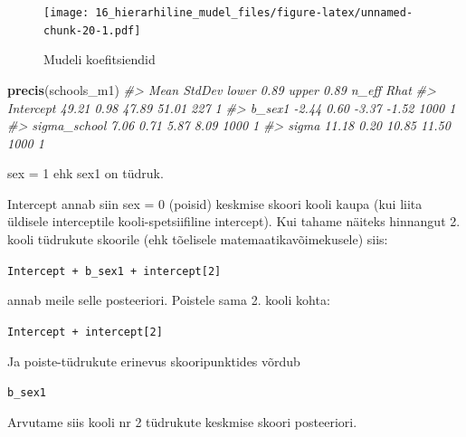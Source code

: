 \documentclass[]{book}
\newenvironment{Shaded}{\begin{snugshade}}{\end{snugshade}}
\newcommand{\CommentTok}[1]{\textcolor[rgb]{0.56,0.35,0.01}{\textit{#1}}}
\newcommand{\DataTypeTok}[1]{\textcolor[rgb]{0.13,0.29,0.53}{#1}}
\newcommand{\DecValTok}[1]{\textcolor[rgb]{0.00,0.00,0.81}{#1}}
\newcommand{\KeywordTok}[1]{\textcolor[rgb]{0.13,0.29,0.53}{\textbf{#1}}}
\newcommand{\NormalTok}[1]{#1}
\newcommand{\OperatorTok}[1]{\textcolor[rgb]{0.81,0.36,0.00}{\textbf{#1}}}
\newcommand{\StringTok}[1]{\textcolor[rgb]{0.31,0.60,0.02}{#1}}
\begin{document}
\begin{figure}
\centering
\texttt{[image: 16\_hierarhiline\_mudel\_files/figure-latex/unnamed-chunk-20-1.pdf]}
\caption{\label{fig:unnamed-chunk-20}Mudeli koefitsiendid}
\end{figure}

\begin{Shaded}
\begin{Highlighting}[]
\KeywordTok{precis}\NormalTok{(schools_m1)}
\CommentTok{#>               Mean StdDev lower 0.89 upper 0.89 n_eff Rhat}
\CommentTok{#> Intercept    49.21   0.98      47.89      51.01   227    1}
\CommentTok{#> b_sex1       -2.44   0.60      -3.37      -1.52  1000    1}
\CommentTok{#> sigma_school  7.06   0.71       5.87       8.09  1000    1}
\CommentTok{#> sigma        11.18   0.20      10.85      11.50  1000    1}
\end{Highlighting}
\end{Shaded}

sex = 1 ehk sex1 on tüdruk.

Intercept annab siin sex = 0 (poisid) keskmise skoori kooli kaupa (kui liita üldisele interceptile kooli-spetsiifiline intercept). Kui tahame näiteks hinnangut 2. kooli tüdrukute skoorile (ehk tõelisele matemaatikavõimekusele) siis:

\texttt{Intercept\ +\ b\_sex1\ +\ intercept{[}2{]}}

annab meile selle posteeriori. Poistele sama 2. kooli kohta:

\texttt{Intercept\ +\ intercept{[}2{]}}

Ja poiste-tüdrukute erinevus skooripunktides võrdub

\texttt{b\_sex1}

Arvutame siis kooli nr 2 tüdrukute keskmise skoori posteeriori.

\begin{Shaded}
\end{Shaded}
\end{document}
